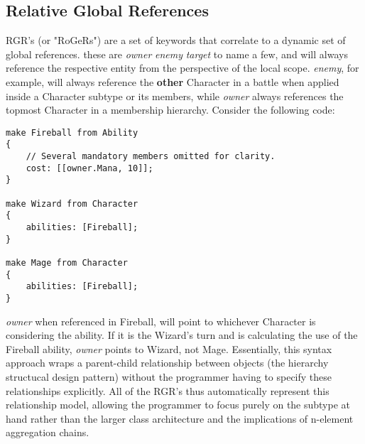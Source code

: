 \subsection{Relative Global References}
RGR's (or "RoGeRs") are a set of keywords that correlate to a dynamic set of global references. these are \emph{owner} \emph{enemy} \emph{target} to name a few, and will always reference the respective entity from the perspective of the local scope. \emph{enemy}, for example, will always reference the \textbf{other} Character in a battle when applied inside a Character subtype or its members, while \emph{owner} always references the topmost Character in a membership hierarchy. Consider the following code:

\begin{lstlisting}
make Fireball from Ability
{
	// Several mandatory members omitted for clarity.
	cost: [[owner.Mana, 10]];
}

make Wizard from Character
{
	abilities: [Fireball];
}

make Mage from Character
{
	abilities: [Fireball];
}
\end{lstlisting}

\emph{owner} when referenced in Fireball, will point to whichever Character is considering the ability. If it is the Wizard's turn and is calculating the use of the Fireball ability, \emph{owner} points to Wizard, not Mage. Essentially, this syntax approach wraps a parent-child relationship between objects (the hierarchy structucal design pattern) without the programmer having to specify these relationships explicitly. All of the RGR's thus automatically represent this relationship model, allowing the programmer to focus purely on the subtype at hand rather than the larger class architecture and the implications of n-element aggregation chains.
